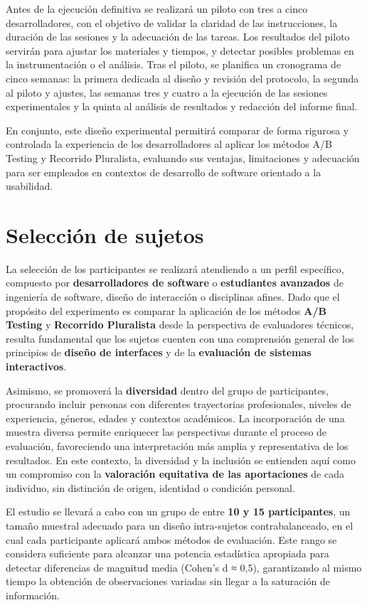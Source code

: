 \documentclass[a4paper,12pt]{report}
\begin{document}
Antes de la ejecución definitiva se realizará un piloto con tres a cinco desarrolladores, con el objetivo de validar la claridad de las instrucciones, la duración de las sesiones y la adecuación de las tareas. Los resultados del piloto servirán para ajustar los materiales y tiempos, y detectar posibles problemas en la instrumentación o el análisis. Tras el piloto, se planifica un cronograma de cinco semanas: la primera dedicada al diseño y revisión del protocolo, la segunda al piloto y ajustes, las semanas tres y cuatro a la ejecución de las sesiones experimentales y la quinta al análisis de resultados y redacción del informe final.

En conjunto, este diseño experimental permitirá comparar de forma rigurosa y controlada la experiencia de los desarrolladores al aplicar los métodos A/B Testing y Recorrido Pluralista, evaluando sus ventajas, limitaciones y adecuación para ser empleados en contextos de desarrollo de software orientado a la usabilidad.


\section{Selección de sujetos}

La selección de los participantes se realizará atendiendo a un perfil específico, compuesto por \textbf{desarrolladores de software} o \textbf{estudiantes avanzados} de ingeniería de software, diseño de interacción o disciplinas afines. Dado que el propósito del experimento es comparar la aplicación de los métodos \textbf{A/B Testing} y \textbf{Recorrido Pluralista} desde la perspectiva de evaluadores técnicos, resulta fundamental que los sujetos cuenten con una comprensión general de los principios de \textbf{diseño de interfaces} y de la \textbf{evaluación de sistemas interactivos}.

Asimismo, se promoverá la \textbf{diversidad} dentro del grupo de participantes, procurando incluir personas con diferentes trayectorias profesionales, niveles de experiencia, géneros, edades y contextos académicos. La incorporación de una muestra diversa permite enriquecer las perspectivas durante el proceso de evaluación, favoreciendo una interpretación más amplia y representativa de los resultados. En este contexto, la diversidad y la inclusión se entienden aquí como un compromiso con la \textbf{valoración equitativa de las aportaciones} de cada individuo, sin distinción de origen, identidad o condición personal.

El estudio se llevará a cabo con un grupo de entre \textbf{10 y 15 participantes}, un tamaño muestral adecuado para un diseño intra-sujetos contrabalanceado, en el cual cada participante aplicará ambos métodos de evaluación. Este rango se considera suficiente para alcanzar una potencia estadística apropiada para detectar diferencias de magnitud media (Cohen’s d ≈ 0,5), garantizando al mismo tiempo la obtención de observaciones variadas sin llegar a la saturación de información.
\end{document}
